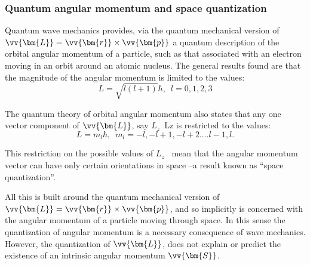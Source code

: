\begin{frame}
\frametitle{Quantum angular momentum and space quantization}
 
Quantum wave mechanics provides, via the quantum mechanical version of 
$\vv{\bm{L}} = \vv{\bm{r}} \times \vv{\bm{p}}$
a quantum description of the orbital angular momentum of a particle, such as that associated with an electron moving in an orbit around an atomic nucleus. The general results found are that the magnitude of the angular momentum is limited to the values:
\[
L = \sqrt{l(l+1)}\hbar, \, \, \, l = 0,1,2,3
\]

The quantum theory of orbital angular momentum also states that any one vector component of 
$\vv{\bm{L}}$, say $L_z$~Lz  is restricted to the values:
\[
L = m_l\hbar, \, \, \, m_l = -l, -l+1, -l+2....l-1, l.
\]

This restriction on the possible values of $L_z$~ mean that the angular momentum vector can have only
certain orientations in space --a result known as ``space quantization''.

All this is built around the quantum mechanical version of $\vv{\bm{L}} = \vv{\bm{r}} \times \vv{\bm{p}}$, and so implicitly is concerned with the angular momentum of a particle moving through space. In this sense the quantization of angular momentum is a necessary consequence of wave mechanics. \alert{However, the quantization of $\vv{\bm{L}}$, does not explain or predict the existence of an intrinsic angular momentum
$\vv{\bm{S}}$}.
\end{frame}
